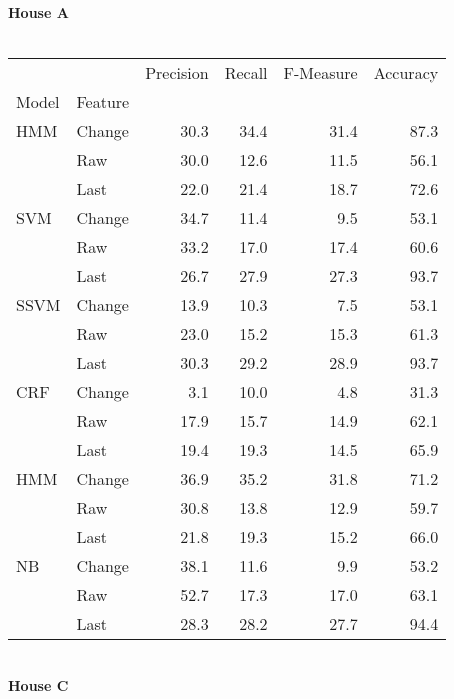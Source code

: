 \documentclass{article}
\begin{document}
\textbf{House A}\\
\vspace{1cm}\\
\begin{tabular}{llrrrr}
\toprule
    &        &  Precision &  Recall &  F-Measure &  Accuracy \\
Model & Feature &            &         &            &           \\
\midrule
HMM & Change &       30.3 &    34.4 &       31.4 &      87.3 \\
    & Raw &       30.0 &    12.6 &       11.5 &      56.1 \\
    & Last &       22.0 &    21.4 &       18.7 &      72.6 \\
SVM & Change &       34.7 &    11.4 &        9.5 &      53.1 \\
    & Raw &       33.2 &    17.0 &       17.4 &      60.6 \\
    & Last &       26.7 &    27.9 &       27.3 &      93.7 \\
SSVM & Change &       13.9 &    10.3 &        7.5 &      53.1 \\
    & Raw &       23.0 &    15.2 &       15.3 &      61.3 \\
    & Last &       30.3 &    29.2 &       28.9 &      93.7 \\
CRF & Change &        3.1 &    10.0 &        4.8 &      31.3 \\
    & Raw &       17.9 &    15.7 &       14.9 &      62.1 \\
    & Last &       19.4 &    19.3 &       14.5 &      65.9 \\
HMM & Change &       36.9 &    35.2 &       31.8 &      71.2 \\
    & Raw &       30.8 &    13.8 &       12.9 &      59.7 \\
    & Last &       21.8 &    19.3 &       15.2 &      66.0 \\
NB & Change &       38.1 &    11.6 &        9.9 &      53.2 \\
    & Raw &       52.7 &    17.3 &       17.0 &      63.1 \\
    & Last &       28.3 &    28.2 &       27.7 &      94.4 \\
\bottomrule
\end{tabular}
\vspace{1cm}\\
\textbf{House C}\\
\vspace{1cm}\\
\end{document}

